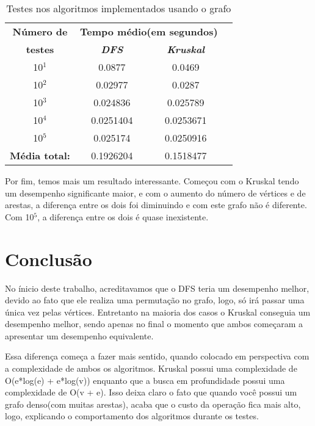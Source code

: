 \documentclass[12pt]{article}
\begin{document}
  \begin{table}[htbp]
    \caption{Testes nos algoritmos implementados usando o grafo }
    \begin{center}
    \begin{tabular}{|c|c|c|c|}
    \hline
    \textbf{Número de}&\multicolumn{2}{|c|}{\textbf{Tempo médio(em segundos)}} \\
    \cline{2-3} 
    \textbf{testes} & \textbf{\textit{DFS}}& \textbf{\textit{Kruskal}} \\
    \hline
    10$^{\mathrm{1}}$& 0.0877 & 0.0469 \\
    \hline
    10$^{\mathrm{2}}$& 0.02977 & 0.0287 \\
    \hline
    10$^{\mathrm{3}}$& 0.024836 & 0.025789 \\
    \hline
    10$^{\mathrm{4}}$& 0.0251404 & 0.0253671 \\
    \hline
    10$^{\mathrm{5}}$& 0.025174 & 0.0250916 \\
    \hline
    \textbf{Média total:} & 0.1926204 & 0.1518477 \\
    \hline
    \end{tabular}
    \end{center}
  \end{table}

  \newpage

  Por fim, temos mais um resultado interessante. Começou com o Kruskal tendo um desempenho 
  significante maior, e com o aumento do número de vértices e de arestas, a diferença entre 
  os dois foi diminuindo e com este grafo não é diferente. Com 10$^{\mathrm{5}}$, a diferença 
  entre os dois é quase inexistente.
  
  \section{Conclusão} \label{sec:conclusion}

  No ínicio deste trabalho, acreditavamos que o DFS teria um desempenho melhor, devido ao fato que
  ele realiza uma permutação no grafo, logo, só irá passar uma única vez pelas vértices. Entretanto 
  na maioria dos casos o Kruskal conseguia um desempenho melhor, sendo apenas no final o momento que 
  ambos começaram a apresentar um desempenho equivalente.

  Essa diferença começa a fazer mais sentido, quando colocado em perspectiva com a complexidade
  de ambos os algoritmos. Kruskal possui uma complexidade de O(e*log(e) + e*log(v)) enquanto que 
  a busca em profundidade possui uma complexidade de O(v + e). Isso deixa claro o fato que quando 
  você possui um grafo denso(com muitas arestas), acaba que o custo da operação fica mais alto, logo, 
  explicando o comportamento dos algoritmos durante os testes.
\end{document}
